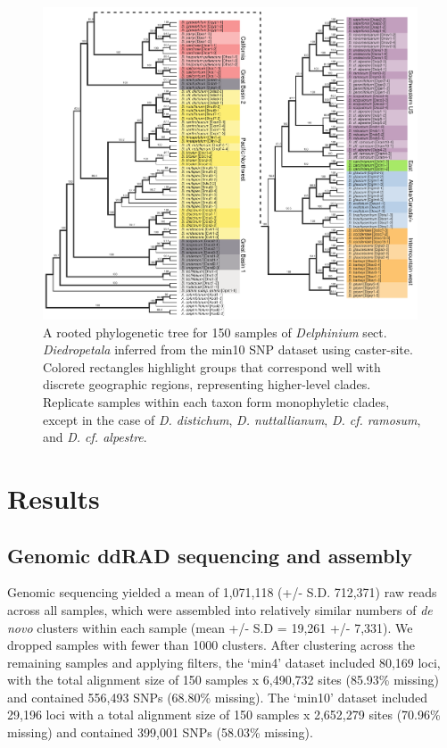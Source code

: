 \documentclass[11pt]{article}
\begin{document}
\begin{figure}[t!]
	\centering
	  \includegraphics[width=0.99\textwidth]{./figures/caster-trees.pdf}	
	\caption{
		A rooted phylogenetic tree for 150 samples of \emph{Delphinium} sect. \emph{Diedropetala}
		inferred from the min10 SNP dataset using caster-site. Colored rectangles highlight
		groups that correspond well with discrete geographic regions, representing higher-level 
		clades. Replicate samples within each taxon form monophyletic clades, except in the case
		of \emph{D. distichum}, \emph{D. nuttallianum}, \emph{D. cf. ramosum}, and \emph{D. cf. alpestre}.
	}
	\label{fig:bigtree}
\end{figure}


\section{Results}
\subsection{Genomic ddRAD sequencing and assembly}
Genomic sequencing yielded a mean of 1,071,118 (+/- S.D. 712,371) raw reads 
across all samples, which were assembled into relatively similar numbers of 
\emph{de novo} clusters within each sample (mean +/- S.D = 19,261 +/- 7,331). 
% 
We dropped samples with fewer than 1000 clusters. 
After clustering across the remaining samples and applying filters, 
the `min4' dataset included 80,169 loci, with the total alignment size of
150 samples x 6,490,732 sites (85.93\% missing) and contained 556,493 
SNPs (68.80\% missing). 
The `min10' dataset included 29,196 loci with a total alignment size of 
150 samples x 2,652,279 sites (70.96\% missing) and contained 399,001 SNPs
(58.03\% missing).
\end{document}
